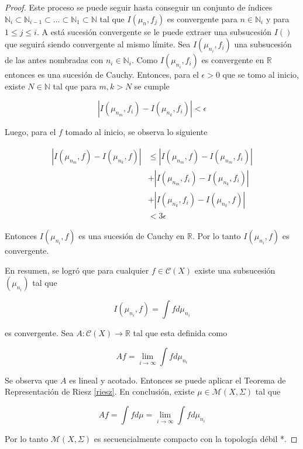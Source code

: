 \begin{proof}
	Este proceso se puede seguir hasta conseguir un conjunto de índices $\mathbb{N}_i \subset \mathbb{N}_{i-1} \subset \ldots \subset \mathbb{N}_1 \subset \mathbb{N}$ tal que $I(\mu_n,f_j)$ es convergente para $n \in \mathbb{N}_i$ y para $1 \leq j \leq i$. A está sucesión convergente se le puede extraer una subsucesión $I()$ que seguirá siendo convergente al mismo límite. Sea $I(\mu_{n_i},f_i)$ una subsucesión de las antes nombradas con $n_i \in \mathbb{N}_i$. Como $I(\mu_{n_i},f_i)$ es convergente en $\mathbb{R}$ entonces es una sucesión de Cauchy. Entonces, para el $\epsilon > 0$ que se tomo al inicio, existe $N \in \mathbb{N}$ tal que para $m,k > N$ se cumple
		
	\begin{equation}
		|I(\mu_{n_m},f_i) - I(\mu_{n_k},f_i)| < \epsilon
	\end{equation}
	
	Luego, para el $f$ tomado al inicio, se observa lo siguiente
	
	\begin{align}
		|I(\mu_{n_m},f) - I(\mu_{n_k},f)| &\leq |I(\mu_{n_m},f) - I(\mu_{n_m},f_i) | \\
		& + |I(\mu_{n_m},f_i) - I(\mu_{n_k},f_i)| \\		
		& + |I(\mu_{n_k},f_i) - I(\mu_{n_k},f)|\\
		& < 3\epsilon
	\end{align}
	
	Entonces $I(\mu_{n_i},f)$ es una sucesión de Cauchy en $\mathbb{R}$. Por lo tanto $I(\mu_{n_i},f)$ es convergente.
	
	En resumen, se logró que para cualquier $f \in \mathcal{C}(X)$ existe una subsucesión $(\mu_{n_i})$ tal que
	
	\begin{equation}
		I(\mu_{n_i},f) = \int f d\mu_{n_i}
	\end{equation}
	
	es convergente. Sea $A: \mathcal{C}(X) \rightarrow \mathbb{R}$ tal que esta definida como
	
	\begin{equation}
		Af = \lim_{i \rightarrow \infty} \int f d \mu_{n_i}
	\end{equation}
	
	Se observa que $A$ es lineal y acotado. Entonces se puede aplicar el Teorema de Representación de Riesz \ref{riesz}. En conclusión, existe $\mu \in \mathcal{M}(X,\Sigma)$ tal que
	
	\begin{equation}
		Af = \int f d\mu = \lim_{i \rightarrow \infty} \int f d \mu_{n_i}
	\end{equation}
	
	Por lo tanto $\mathcal{M}(X,\Sigma)$ es secuencialmente compacto con la topología débil *.
\end{proof}

